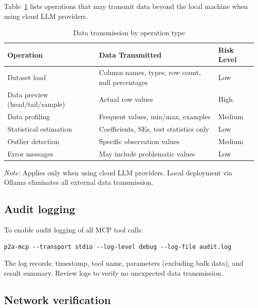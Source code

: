 Table~\ref{tab:data-transmission} lists operations that may transmit data
beyond the local machine when using cloud LLM providers.

\begin{table}[htbp]
\centering
\begin{threeparttable}
\caption{Data transmission by operation type}
\label{tab:data-transmission}
\small
\begin{tabular}{lp{6cm}l}
\toprule
Operation & Data Transmitted & Risk Level \\
\midrule
Dataset load & Column names, types, row count, null percentages & Low \\
Data preview (head/tail/sample) & Actual row values & High \\
Data profiling & Frequent values, min/max, examples & Medium \\
Statistical estimation & Coefficients, SEs, test statistics only & Low \\
Outlier detection & Specific observation values & Medium \\
Error messages & May include problematic values & Low \\
\bottomrule
\end{tabular}
\begin{tablenotes}[flushleft]
\item \emph{Note:} Applies only when using cloud LLM providers. Local
deployment via Ollama eliminates all external data transmission.
\end{tablenotes}
\end{threeparttable}
\end{table}

\subsection{Audit logging}

To enable audit logging of all MCP tool calls:

\begin{verbatim}
p2a-mcp --transport stdio --log-level debug --log-file audit.log
\end{verbatim}

\noindent The log records: timestamp, tool name, parameters (excluding bulk
data), and result summary. Review logs to verify no unexpected data transmission.

\subsection{Network verification}

